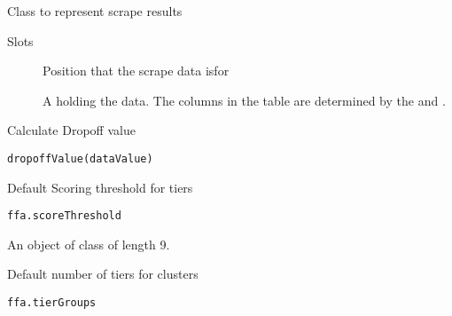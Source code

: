 \documentclass[a4paper]{book}
\begin{document}
%
\begin{Description}\relax
Class to represent scrape results
\end{Description}
%
\begin{Section}{Slots}

\begin{description}

\item[] Position that the scrape data isfor

\item[] A  holding the data. The columns in the
table are determined by the  and .

\end{description}
\end{Section}
%
\begin{Description}\relax
Calculate Dropoff value
\end{Description}
%
\begin{Usage}
\begin{verbatim}
dropoffValue(dataValue)
\end{verbatim}
\end{Usage}
%
\begin{Description}\relax
Default Scoring threshold for tiers
\end{Description}
%
\begin{Usage}
\begin{verbatim}
ffa.scoreThreshold
\end{verbatim}
\end{Usage}
%
\begin{Format}
An object of class  of length 9.
\end{Format}
%
\begin{Description}\relax
Default number of tiers for clusters
\end{Description}
%
\begin{Usage}
\begin{verbatim}
ffa.tierGroups
\end{verbatim}
\end{Usage}
\end{document}
